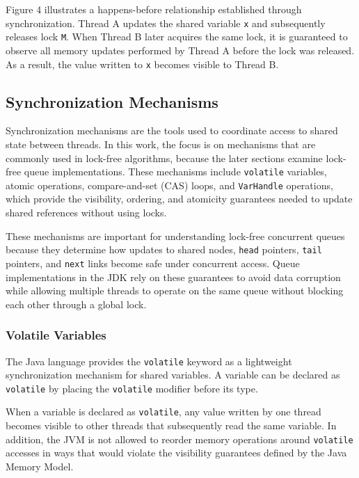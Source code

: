 
Figure 4 illustrates a happens-before relationship established through synchronization. Thread A updates the shared variable \texttt{x} and subsequently releases lock \texttt{M}. When Thread B later acquires the same lock, it is guaranteed to observe all memory updates performed by Thread A before the lock was released. As a result, the value written to \texttt{x} becomes visible to Thread B. \cite{java-concurrency}

\subsection{Synchronization Mechanisms}
Synchronization mechanisms are the tools used to coordinate access to shared state between threads. In this work, the focus is on mechanisms that are commonly used in lock-free algorithms, because the later sections examine lock-free queue implementations. These mechanisms include \texttt{volatile} variables, atomic operations, compare-and-set (CAS) loops, and \texttt{VarHandle} operations, which provide the visibility, ordering, and atomicity guarantees needed to update shared references without using locks.

These mechanisms are important for understanding lock-free concurrent queues because they determine how updates to shared nodes, \texttt{head} pointers, \texttt{tail} pointers, and \texttt{next} links become safe under concurrent access. Queue implementations in the JDK rely on these guarantees to avoid data corruption while allowing multiple threads to operate on the same queue without blocking each other through a global lock.

\subsubsection{Volatile Variables}
The Java language provides the \texttt{volatile} keyword as a lightweight synchronization mechanism for shared variables. A variable can be declared as \texttt{volatile} by placing the \texttt{volatile} modifier before its type. \cite{java-concurrency}

When a variable is declared as \texttt{volatile}, any value written by one thread becomes visible to other threads that subsequently read the same variable. In addition, the JVM is not allowed to reorder memory operations around \texttt{volatile} accesses in ways that would violate the visibility guarantees defined by the Java Memory Model. \cite{java-concurrency}

